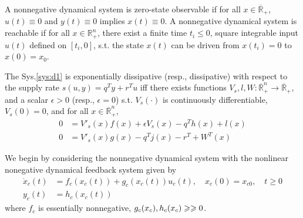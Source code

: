 \documentclass{paper}
\begin{document}
\begin{defi}
A nonnegative dynamical system is zero-state observable if for all $x\in\overline{\mathbb{R}}_{+}$, $u(t)\equiv 0$ and $y(t)
\equiv 0$ implies $x(t)\equiv 0$. A nonnegative dynamical system is reachable if for all $x\in\mathbb{R}_+^n$, there exist a finite time
$t_i\leqslant 0$, square integrable input $u(t)$ defined on $[t_i,0]$, s.t. the state $x(t)$ can be driven from $x(t_i)=0$ to $x(0)=x_0$.
\end{defi}
\begin{thm}
The Sys.\ref{sys:d1} is exponentially dissipative (resp., dissipative) with respect to the supply rate $s(u,y)=q^Ty+r^Tu$ iff
there exists functions $V_s,l,W:\overline{\mathbb{R}}_{+}^n\rightarrow \overline{\mathbb{R}}_{+}$, and a scalar $\epsilon>0$
(resp., $\epsilon =0$) s.t. $V_s(\cdot)$ is continuously differentiable, $V_s(0)=0$, and for all $x\in\overline{\mathbb{R}}_{+}^n$,
\begin{align}
0&=V'_s(x)f(x)+\epsilon V_s(x)-q^Th(x)+l(x) \\
0&=V'_s(x)g(x)-q^Tj(x)-r^T+W^T(x) \nonumber
\end{align}
\end{thm}
We begin by considering the nonnegative dynamical system with the nonlinear nonegative dynamical feedback system given by
\begin{align}\label{sys:dc}
\dot{x}_c(t)&=f_c(x_c(t))+g_c(x_c(t))u_c(t),\quad x_c(0)=x_{c0},\quad t\geqslant 0\\
y_c(t)&=h_c(x_c(t)) \nonumber
\end{align}
where $f_c$ is essentially nonnegative, $g_c(x_c),h_c(x_c)\geqslant\geqslant 0$.
\end{document}
